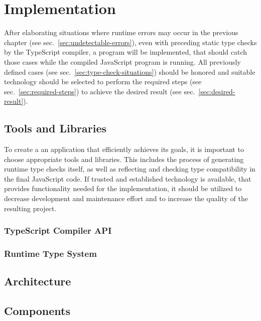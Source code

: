 
\chapter{Implementation}
\label{cha:implementation}

After elaborating situations where runtime errors may occur in the previous chapter (see sec.~\ref{sec:undetectable-errors}), even with preceding static type checks by the TypeScript compiler, a program will be implemented, that should catch those cases while the compiled JavaScript program is running. All previously defined cases (see sec.~\ref{sec:type-check-situations}) should be honored and suitable technology should be selected to perform the required steps (see sec.~\ref{sec:required-steps}) to achieve the desired result (see sec.~\ref{sec:desired-result}).

\section{Tools and Libraries}
\label{sec:tools-libraries}

To create a an application that efficiently achieves its goals, it is important to choose appropriate tools and libraries. This includes the process of generating runtime type checks itself, as well as reflecting and checking type compatibility in the final JavaScript code. If trusted and established technology is available, that provides functionality needed for the implementation, it should be utilized to decrease development and maintenance effort and to increase the quality of the resulting project.

\subsection{TypeScript Compiler API}



\subsection{Runtime Type System}

\section{Architecture}
\label{sec:architecture}

\section{Components}
\label{sec:components}

